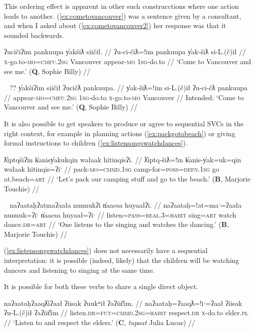 This ordering effect is apparent in other such construcctions where one action leads to another. (\ref{ex:cometovancouver}) was a sentence given by a consultant, and when I asked about (\ref{ex:cometovancouver2}) her response was that it sounded backwards.

\ex \label{ex:cometovancouver}
\begingl
\glpreamble ʔucičiʔim pankuupa y̓akšiƛ siičił. //
\gla ʔu-ci-čiƛ=!im pankuupa y̓ak-šiƛ si-L.(č)ił //
\glb \textsc{x}-go.to-\textsc{mo}=\textsc{cmfu.2sg} Vancouver appear-\textsc{mo} \textsc{1sg}-do.to //
\glft `Come to Vancouver and see me.' (\textbf{Q}, Sophie Billy) //
\endgl
\xe

\ex~ \label{ex:cometovancouver2}
\begingl
\glpreamble ?? y̓akšiʔim siičił ʔucičƛ pankuupa. //
\gla y̓ak-šiƛ=!im si-L.(č)ił ʔu-ci-čƛ pankuupa //
\glb appear-\textsc{mo}=\textsc{cmfu.2sg} \textsc{1sg}-do.to \textsc{x}-go.to-\textsc{mo} Vancouver //
\glft Intended: `Come to Vancouver and see me.' (\textbf{Q}, Sophie Billy) //
\endgl
\xe

It is also possible to get speakers to produce or agree to sequential SVCs in the right context, for example in planning actions (\ref{ex:packgotobeach}) or giving formal instructions to children (\ref{ex:listensongswatchdances}).

\ex \label{ex:packgotobeach}
\begingl
\glpreamble ƛ̓iptqšiʔin k̓anisy̓akukqin wałaak hitinqisʔi. //
\gla ƛ̓iptq-šiƛ=!in k̓anis-y̓ak=uk=qin wałaak hitinqis=ʔiˑ //
\glb pack-\textsc{mo}=\textsc{cmmd.1sg} camp-for=\textsc{poss}=\textsc{defn.1sg} go at.beach=\textsc{art} //
\glft `Let's pack our camping stuff and go to the beach.' (\textbf{B}, Marjorie Touchie) //
\endgl
\xe

\ex~ \label{ex:listensongswatchdances}
\begingl
\glpreamble naʔaataḥʔatmaʔaała nunuukʔi n̓aacsa huyaałʔi. //
\gla naʔaataḥ=!at=maˑ=ʔaała nunuuk=ʔiˑ n̓aacsa huyaał=ʔiˑ //
\glb listen=\textsc{pass}=\textsc{real.3}=\textsc{habit} sing=\textsc{art} watch dance.\textsc{dr}=\textsc{art} //
\glft `One listens to the singing and watches the dancing.' (\textbf{B}, Marjorie Touchie) //
\endgl
\xe

(\ref{ex:listensongswatchdances}) does not necessarily have a sequential interpretation: it is possible (indeed, likely) that the children will be watching dancers and listening to singing at the same time.

It is possible for both these verbs to share a single direct object.

\ex \label{ex:usechairclimb}
\begingl
\glpreamble naʔaataḥʔaaqƛ̓iʔaał ʔiisak ʔuukʷił ʔaʔiič̓im. //
\gla naʔaataḥ=ʔaaqƛ=!iˑ=ʔaał ʔiisak ʔu-L.(č)ił ʔaʔiič̓im //
\glb listen.\textsc{dr}=\textsc{fut}=\textsc{cmmd.2sg}=\textsc{habit} respect.\textsc{dr} \textsc{x}-do.to elder.\textsc{pl} //
\glft `Listen to and respect the elders.' (\textbf{C}, \textit{tupaat} Julia Lucas) //
\endgl
\xe

